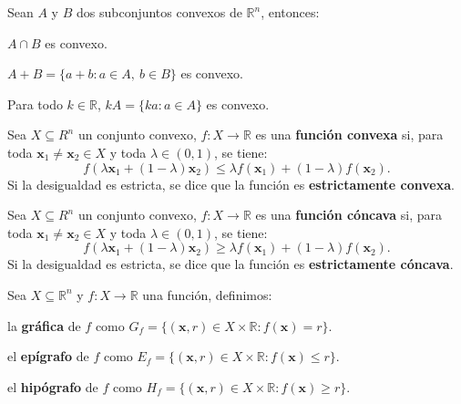 \documentclass[8pt,a4paper]{extarticle}
\begin{document}
\begin{multicols}{3}
\begin{boxprop}
	Sean $A$ y $B$ dos subconjuntos convexos de $\mathbb{R}^n$, entonces:
	\begin{eqlist}
	\item $A \cap B$ es convexo.
	\item $A + B = \{a + b : a \in A,\ b \in B\}$ es convexo.
	\item Para todo $k \in \mathbb{R}$, $kA = \{ka : a\in A\}$ es convexo.
	\end{eqlist}
\end{boxprop}

\begin{boxdef}
	Sea $X \subseteq R^n$ un conjunto convexo, $f : X \to \mathbb{R}$ es una \textbf{función convexa} si, para toda $\mathbf{x}_1 \neq \mathbf{x}_2 \in X$ y toda $\lambda \in (0, 1)$, se tiene:
	\[
		f(\lambda \mathbf{x}_1 + (1 - \lambda)\mathbf{x}_2) \le \lambda f(\mathbf{x}_1) + (1 - \lambda) f(\mathbf{x}_2)
	.\] 
	Si la desigualdad es estricta, se dice que la función es \textbf{estrictamente convexa}.
\end{boxdef}

\begin{boxdef}                                                                                         
    Sea $X \subseteq R^n$ un conjunto convexo, $f : X \to \mathbb{R}$ es una \textbf{función cóncava} si, para toda $\mathbf{x}_1 \neq \mathbf{x}_2 \in X$ y toda $\lambda \in (0, 1)$, se tiene:
    \[                                                                                                                  
        f(\lambda \mathbf{x}_1 + (1 - \lambda)\mathbf{x}_2) \ge \lambda f(\mathbf{x}_1) + (1 - \lambda) f(\mathbf{x}_2)                                     
    .\]                                                                                                                 
    Si la desigualdad es estricta, se dice que la función es \textbf{estrictamente cóncava}.                            
\end{boxdef}

\begin{boxdef}
	Sea $X \subseteq \mathbb{R}^n$ y $f : X \to \mathbb{R}$ una función, definimos:
	\begin{bulletlist}
	\item la \textbf{gráfica} de $f$ como $G_f = \{ (\mathbf{x}, r) \in X \times \mathbb{R} : f(\mathbf{x}) = r \} $.
	\item el \textbf{epígrafo} de $f$ como $E_f = \{ (\mathbf{x}, r) \in X \times \mathbb{R} : f(\mathbf{x}) \le r \}$.
	\item el \textbf{hipógrafo} de $f$ como $H_f = \{ (\mathbf{x}, r) \in X \times \mathbb{R} : f(\mathbf{x}) \ge r \}$.
	\end{bulletlist}
\end{boxdef}


\end{multicols}
\end{document}

